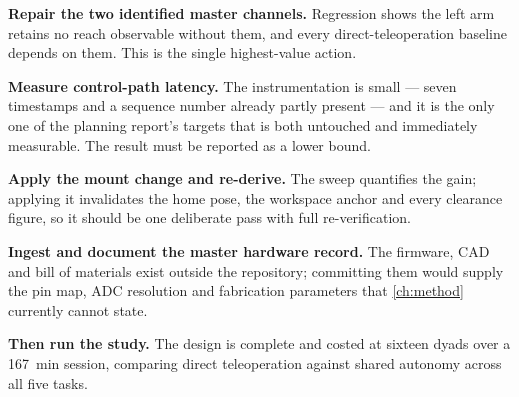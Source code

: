\textbf{Repair the two identified master channels.} Regression shows the left
arm retains no reach observable without them, and every direct-teleoperation
baseline depends on them. This is the single highest-value action.

\textbf{Measure control-path latency.} The instrumentation is small --- seven
timestamps and a sequence number already partly present --- and it is the only
one of the planning report's targets that is both untouched and immediately
measurable. The result must be reported as a lower bound.

\textbf{Apply the mount change and re-derive.} The sweep quantifies the gain;
applying it invalidates the home pose, the workspace anchor and every
clearance figure, so it should be one deliberate pass with full
re-verification.

\textbf{Ingest and document the master hardware record.} The firmware, CAD and
bill of materials exist outside the repository; committing them would supply
the pin map, ADC resolution and fabrication parameters that
\cref{ch:method} currently cannot state.

\textbf{Then run the study.} The design is complete and costed at sixteen
dyads over a \SI{167}{\minute} session, comparing direct teleoperation against
shared autonomy across all five tasks.
